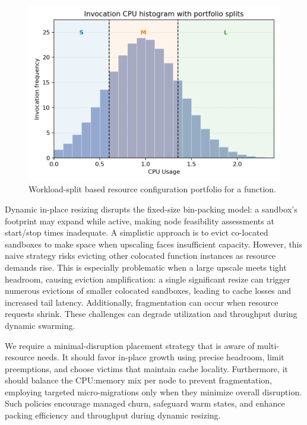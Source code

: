 \begin{figure}[t]
  \centering
  \includegraphics[width=0.9\linewidth]{figures/background/challenge1_mix.png}
  \caption{Workload-split based resource configuration portfolio for a function.}
  \label{fig:challenge1}
\end{figure}


 Dynamic in-place
resizing disrupts the fixed-size bin-packing model: a sandbox’s footprint may
expand while active, making node feasibility assessments at start/stop times
inadequate. A simplistic approach is to evict co-located sandboxes to make space
when upscaling faces insufficient capacity. However, this naive strategy risks
evicting other colocated function instances as resource demands rise. This is
especially problematic when a large upscale meets tight headroom, causing
eviction amplification: a single significant resize can trigger numerous evictions
of smaller colocated sandboxes, leading to cache losses and increased tail
latency. Additionally, fragmentation can occur when resource requests shrink.
These challenges can degrade utilization and throughput during dynamic swarming.

We require a minimal-disruption placement strategy that is aware of
multi-resource needs. It should favor in-place growth using precise headroom,
limit preemptions, and choose victims that maintain cache locality. Furthermore,
it should balance the CPU:memory mix per node to prevent fragmentation, employing
targeted micro-migrations only when they minimize overall disruption. Such policies
encourage managed churn, safeguard warm states, and enhance packing efficiency
and throughput during dynamic resizing.

